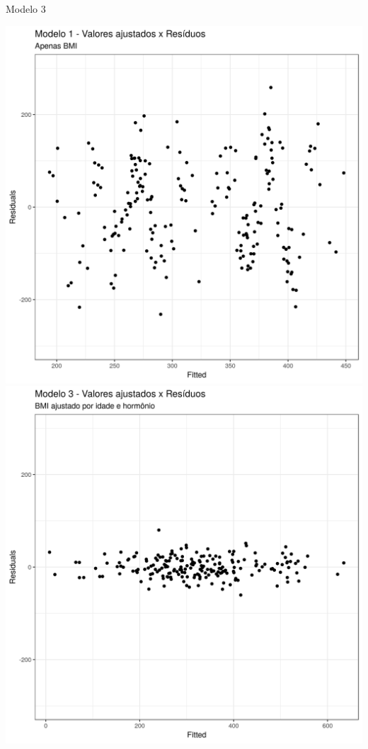 \documentclass{beamer}
\begin{document}
\begin{frame}{\small Modelo 3}
  \begin{center}
    \includegraphics[height=.6\textheight]{Cap31-32/pratica-rlm1-resid}
    \includegraphics[height=.6\textheight]{Cap31-32/pratica-rlm3-resid}
  \end{center}
\end{frame}
\end{document}
